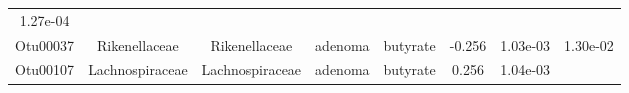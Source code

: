 \documentclass[11pt,]{article}
\begin{document}
\begin{longtable}[]{@{}cccccccc@{}}
\begin{minipage}[t]{0.08\columnwidth}
1.27e-04\strut
\end{minipage}\tabularnewline
\begin{minipage}[t]{0.08\columnwidth}\centering\strut
Otu00037\strut
\end{minipage} & \begin{minipage}[t]{0.15\columnwidth}\centering\strut
Rikenellaceae\strut
\end{minipage} & \begin{minipage}[t]{0.15\columnwidth}\centering\strut
Rikenellaceae\strut
\end{minipage} & \begin{minipage}[t]{0.08\columnwidth}\centering\strut
adenoma\strut
\end{minipage} & \begin{minipage}[t]{0.09\columnwidth}\centering\strut
butyrate\strut
\end{minipage} & \begin{minipage}[t]{0.07\columnwidth}\centering\strut
-0.256\strut
\end{minipage} & \begin{minipage}[t]{0.08\columnwidth}\centering\strut
1.03e-03\strut
\end{minipage} & \begin{minipage}[t]{0.08\columnwidth}\centering\strut
1.30e-02\strut
\end{minipage}\tabularnewline
\begin{minipage}[t]{0.08\columnwidth}\centering\strut
Otu00107\strut
\end{minipage} & \begin{minipage}[t]{0.15\columnwidth}\centering\strut
Lachnospiraceae\strut
\end{minipage} & \begin{minipage}[t]{0.15\columnwidth}\centering\strut
Lachnospiraceae\strut
\end{minipage} & \begin{minipage}[t]{0.08\columnwidth}\centering\strut
adenoma\strut
\end{minipage} & \begin{minipage}[t]{0.09\columnwidth}\centering\strut
butyrate\strut
\end{minipage} & \begin{minipage}[t]{0.07\columnwidth}\centering\strut
0.256\strut
\end{minipage} & \begin{minipage}[t]{0.08\columnwidth}\centering\strut
1.04e-03\strut
\end{minipage} & \begin{minipage}[t]{0.08\columnwidth}\centering\strut

\end{minipage}
\end{longtable}
\end{document}
